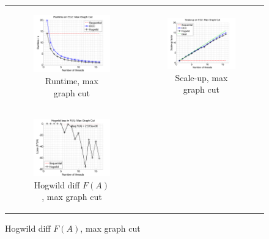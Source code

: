 \documentclass{article} %
\begin{document}
\begin{figure}[ht]
  \centering
  \begin{tabular}{cc}
	  \begin{subfigure}[b]{0.5\textwidth}
	  	\includegraphics[width=200pt]{images/runtime_maxgraphcut_500000_2.png}
			\caption{Runtime, max graph cut}
			\label{fig:runtime_maxgraphcut}
	  \end{subfigure} &
	  \begin{subfigure}[b]{0.5\textwidth}
	  	\includegraphics[width=200pt]{images/scaleup_maxgraphcut_500000_2.png}
			\caption{Scale-up, max graph cut}
			\label{fig:scale_maxgraphcut}
	  \end{subfigure} \\
	  \begin{subfigure}[b]{0.5\textwidth}
	  	\includegraphics[width=200pt]{images/diffFA_Hogwild_maxgraphcut_500000_2.png}
			\caption{Hogwild diff $F(A)$, max graph cut}
			\label{fig:hogdiffFA_maxgraphcut}
	  \end{subfigure} &

\end{tabular}
\end{figure}
\end{document}
